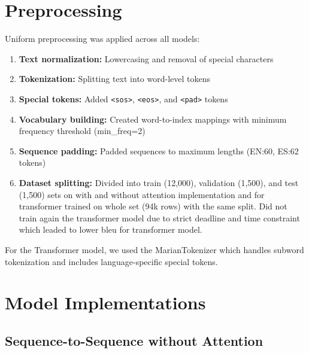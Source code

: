 \documentclass[12pt]{article}
\begin{document}
\section{Preprocessing}
Uniform preprocessing was applied across all models:

\begin{enumerate}
    \item \textbf{Text normalization:} Lowercasing and removal of special characters
    \item \textbf{Tokenization:} Splitting text into word-level tokens
    \item \textbf{Special tokens:} Added \texttt{<sos>}, \texttt{<eos>}, and \texttt{<pad>} tokens
    \item \textbf{Vocabulary building:} Created word-to-index mappings with minimum frequency threshold (min\_freq=2)
    \item \textbf{Sequence padding:} Padded sequences to maximum lengths (EN:60, ES:62 tokens)
    \item \textbf{Dataset splitting:} Divided into train (12,000), validation (1,500), and test (1,500) sets on with and without attention implementation and for transformer trained on whole set (94k rows) with the same split. Did not train again the transformer model due to strict deadline and time constraint which leaded to lower bleu for transformer model.
\end{enumerate}

For the Transformer model, we used the MarianTokenizer which handles subword tokenization and includes language-specific special tokens.

\section{Model Implementations}

\subsection{Sequence-to-Sequence without Attention}
\end{document}
